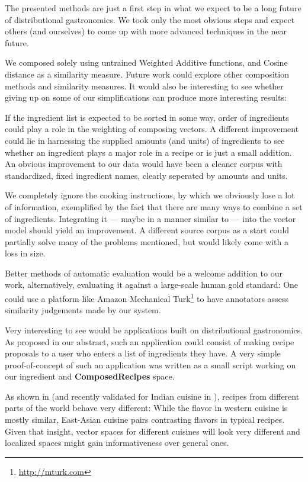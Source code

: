 The presented methods are just a first step in what we expect to be a long future of distributional gastronomics. We took only the most obvious steps and expect others (and ourselves) to come up with more advanced techniques in the near future.

We composed solely using untrained Weighted Additive functions, and Cosine distance as a similarity measure. Future work could explore other composition methods and similarity measures. It would also be interesting to see whether giving up on some of our simplifications can produce more interesting results:

If the ingredient list is expected to be sorted in some way, order of ingredients could play a role in the weighting of composing vectors. A different improvement could lie in harnessing the supplied amounts (and units) of ingredients to see whether an ingredient plays a major role in a recipe or is just a small addition. An obvious improvement to our data would have been a cleaner corpus with standardized, fixed ingredient names, clearly seperated by amounts and units.

We completely ignore the cooking instructions, by which we obviously lose a lot of information, exemplified by the fact that there are many ways to combine a set of ingredients. Integrating it --- maybe in a manner similar to \cite{teng2012recipe} --- into the vector model should yield an improvement. A different source corpus as a start could partially solve many of the problems mentioned, but would likely come with a loss in size.


Better methods of automatic evaluation would be a welcome addition to our work, alternatively, evaluating it against a large-scale human gold standard: One could use a platform like Amazon Mechanical Turk\footnote{\url{http://mturk.com}} to have annotators assess similarity judgements made by our system.

Very interesting to see would be applications built on distributional gastronomics. As proposed in our abstract, such an application could consist of making recipe proposals to a user who enters a list of ingredients they have. A very simple proof-of-concept of such an application was written as a small script working on our ingredient and \textbf{ComposedRecipes} space.

As shown in \cite{ahn2011flavor} (and recently validated for Indian cuisine in \cite{2015arXiv150203815J}), recipes from different parts of the world behave very different: While the flavor in western cuisine is mostly similar, East-Asian cuisine pairs contrasting flavors in typical recipes. Given that insight, vector spaces for different cuisines will look very different and localized spaces might gain informativeness over general ones.
